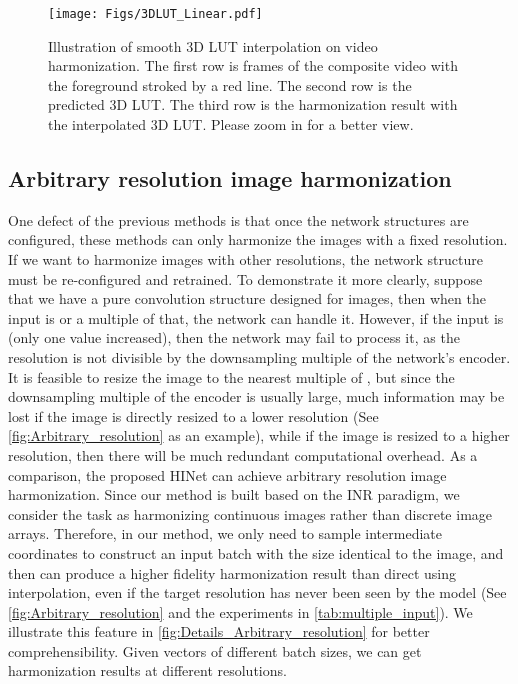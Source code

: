 \documentclass[10pt,journal,twocolumn,twoside]{IEEEtran}
\begin{document}
\begin{figure}[t]
  \centering
   \texttt{[image: Figs/3DLUT\_Linear.pdf]}
   \caption{Illustration of smooth 3D LUT interpolation on video harmonization. The first row is frames of the composite video with the foreground stroked by a red line. The second row is the predicted 3D LUT. The third row is the harmonization result with the interpolated 3D LUT. Please zoom in for a better view.}
   \label{fig:3DLUT_linear}
\end{figure}

\subsection{Arbitrary resolution image harmonization}
One defect of the previous methods \cite{guo2021intrinsic, hang2022scs} is that once the network structures are configured, these methods can only harmonize the images with a fixed resolution. If we want to harmonize images with other resolutions, the network structure must be re-configured and retrained. To demonstrate it more clearly, suppose that we have a pure convolution structure designed for  images, then when the input is  or a multiple of that, the network can handle it. However, if the input is \eg  (only one value increased), then the network may fail to process it, as the resolution  is not divisible by the downsampling multiple of the network's encoder. It is feasible to resize the image to the nearest multiple of , but since the downsampling multiple of the encoder is usually large\cite{sofiiuk2021foreground}, much information may be lost if the image is directly resized to a lower resolution (See \cref{fig:Arbitrary_resolution} as an example), while if the image is resized to a higher resolution, then there will be much redundant computational overhead. As a comparison, the proposed HINet can achieve arbitrary resolution image harmonization. Since our method is built based on the INR paradigm, we consider the task as harmonizing continuous images rather than discrete image arrays. Therefore, in our method, we only need to sample intermediate coordinates to construct an input batch with the size identical to the image, and then can produce a higher fidelity harmonization result than direct using interpolation, even if the target resolution has never been seen by the model (See \cref{fig:Arbitrary_resolution} and the experiments in \cref{tab:multiple_input}). We illustrate this feature in \cref{fig:Details_Arbitrary_resolution} for better comprehensibility. Given vectors of different batch sizes, we can get harmonization results at different resolutions.
\end{document}
